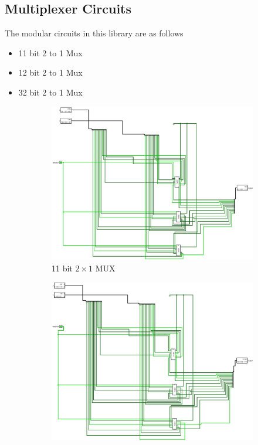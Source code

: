 \documentclass[12pt]{article}
\begin{document}
\subsection{Multiplexer Circuits}
The modular circuits in this library are as follows 
\begin{itemize}

    \item 11 bit 2 to 1 Mux 
    \item 12 bit 2 to 1 Mux 
    \item 32 bit 2 to 1 Mux 

\end{itemize}
\begin{figure}[H]
    \centering
    \begin{subfigure}[b]{0.3\textwidth}
        \includegraphics[width=\textwidth]{images/MUX_11_bit.jpg}
        \caption{11 bit $2\times1$ MUX}
        \label{fig:11b2x1mux}
    \end{subfigure}
    \begin{subfigure}[b]{0.3\textwidth}
        \includegraphics[width=\textwidth]{images/MUX_12_bit.jpg}

\end{subfigure}
\end{figure}
\end{document}
